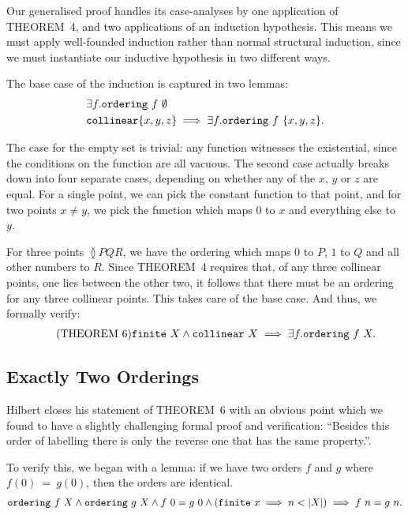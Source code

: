 Our generalised proof handles its case-analyses by one application of THEOREM~4, and two applications of an induction hypothesis. This means we must apply well-founded induction rather than normal structural induction, since we must instantiate our inductive hypothesis in two different ways. 

The base case of the induction is captured in two lemmas:
\begin{displaymath}
  \begin{aligned}
    &\exists f. \code{ordering}\ f\ \emptyset\\
    &\code{collinear} \{x,y,z\} \implies \exists f. \code{ordering}\ f\ \{x,y,z\}.
  \end{aligned}
\end{displaymath}

The case for the empty set is trivial: any function witnesses the existential, since the conditions on the function are all vacuous. The second case actually breaks down into four separate cases, depending on whether any of the $x$, $y$ or $z$ are equal. For a single point, we can pick the constant function to that point, and for two points $x \neq y$, we pick the function which maps $0$ to $x$ and everything else to $y$.

For three points $\between{P}{Q}{R}$, we have the ordering which maps $0$ to $P$, $1$ to $Q$ and all other numbers to $R$. Since THEOREM~4 requires that, of any three collinear points, one lies between the other two, it follows that there must be an ordering for any three collinear points. This takes care of the base case. And thus, we formally verify:
\begin{equation}
  \label{eq:six}
  \tag{THEOREM~6}
  \begin{split}
    \texttt{finite}\ X \wedge \texttt{collinear}\ X \implies \exists f. \texttt{ordering}\ f\ X.
  \end{split}
\end{equation}

\subsection{Exactly Two Orderings}
Hilbert closes his statement of THEOREM~6 with an obvious point which we found to have a slightly challenging formal proof and verification: ``Besides this order of labelling there is only the reverse one that has the same property.''.

To verify this, we began with a lemma: if we have two orders $f$ and $g$ where\linebreak $f(0)~=~g(0)$, then the orders are identical. 
\begin{multline*}
  \texttt{ordering}\ f\ X \wedge \texttt{ordering}\ g\ X \wedge f\ 0 = g\ 0
  \wedge (\texttt{finite}\ x \implies n < |X|) \implies f\ n = g\ n.
\end{multline*}

